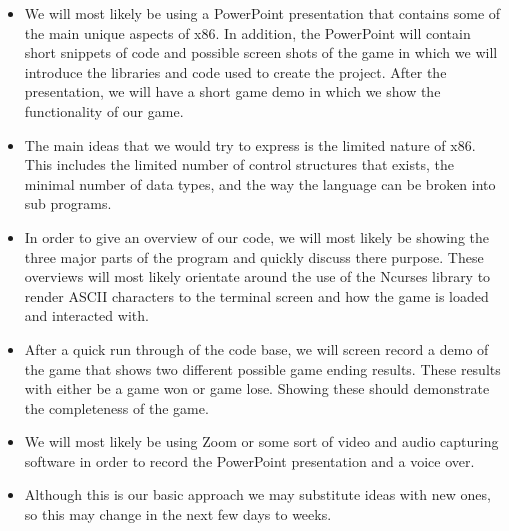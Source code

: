 \documentclass{article}
\begin{document}


\begin{itemize}
    \item We will most likely be using a PowerPoint presentation that contains some of the main unique aspects of x86. In addition, the PowerPoint will contain short snippets of code and possible screen shots of the game in which we will introduce the libraries and code used to create the project. After the presentation, we will have a short game demo in which we show the functionality of our game.
    \item The main ideas that we would try to express is the limited nature of x86. This includes the limited number of control structures that exists, the minimal number of data types, and the way the language can be broken into sub programs.
    \item In order to give an overview of our code, we will most likely be showing the three major parts of the program and quickly discuss there purpose. These overviews will most likely orientate around the use of the Ncurses library to render ASCII characters to the terminal screen and how the game is loaded and interacted with.
    \item After a quick run through of the code base, we will screen record a demo of the game that shows two different possible game ending results. These results with either be a game won or game lose. Showing these should demonstrate the completeness of the game.
    \item We will most likely be using Zoom or some sort of video and audio capturing software in order to record the PowerPoint presentation and a voice over.
    \item Although this is our basic approach we may substitute ideas with new ones, so this may change in the next few days to weeks.
\end{itemize}
\end{document}
